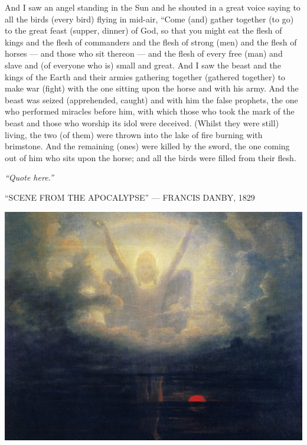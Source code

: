\begin{pages}
\begin{Leftside}
		\pend
		\pstart
		And I saw an angel standing in the Sun and he shouted in a great voice saying to all the birds (every bird) flying in mid-air, “Come (and) gather together (to go) to the great feast (supper, dinner) of God, so that you might eat the flesh of kings and the flesh of commanders and the flesh of strong (men) and the flesh of horses — and those who sit thereon — and the flesh of every free (man) and slave and (of everyone who is) small and great. 
		\pend
		\pstart
		And I saw the beast and the kings of the Earth and their armies gathering together (gathered together) to make war (fight) with the one sitting upon the horse and with his army. And the beast was seized (apprehended, caught) and with him the false prophets, the one who performed miracles before him, with which those who took the mark of the beast and those who worship its idol were deceived. (Whilst they were still) living, the two (of them) were thrown into the lake of fire burning with brimstone. And the remaining (ones) were killed by the sword, the one coming out of him who sits upon the horse; and all the birds were filled from their flesh. 
		\pend
        \endnumbering
    \end{Leftside}

\end{pages} 
\Pages

\clearpage
\thispagestyle{empty}
\null\vfill
\settowidth{}
\begin{center}
\parbox{\longest}{%
  \raggedright{\huge\itshape%
    ``Quote here.'' \par\bigskip
  }
  \raggedleft\Large\MakeUppercase{``Scene from the Apocalypse'' — Francis Danby, 1829}\par%
}
\vfill\vfill
\clearpage\newpage
\end{center}
\newpage
\thispagestyle{empty}
\begin{center}
	\includegraphics[angle=90, width=1\textwidth]{images/illustrations/danbyapocalypse}
\end{center}